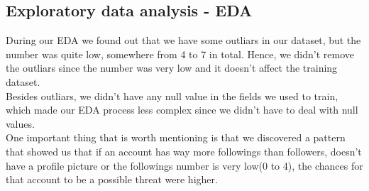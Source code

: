 \subsection{Exploratory data analysis - EDA}
During our EDA we found out that we have some outliars in our dataset, but the number was quite low, somewhere from 4 to 7
in total. Hence, we didn't remove the outliars since the number was very low and it doesn't affect the training dataset.
\\[5pt]
Besides outliars, we didn't have any null value in the fields we used to train, which made our EDA process less complex
since we didn't have to deal with null values.
\\[5pt]
One important thing that is worth mentioning is that we discovered a pattern that showed us that if an account has
way more followings than followers, doesn't have a profile picture or the followings number is very low(0 to 4), the
chances for that account to be a possible threat were higher.
